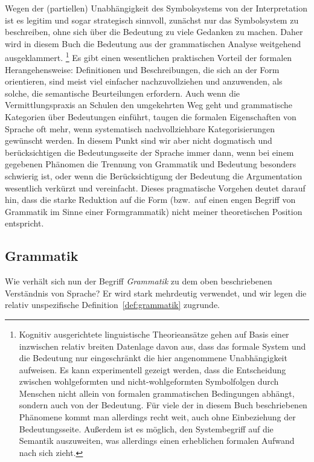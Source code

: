 Wegen der (partiellen) Unabhängigkeit des Symbolsystems von der Interpretation ist es legitim und sogar strategisch sinnvoll, zunächst nur das Symbolsystem zu beschreiben, ohne sich über die Bedeutung zu viele Gedanken zu machen.
Daher wird in diesem Buch die Bedeutung aus der grammatischen Analyse weitgehend ausgeklammert.%
\footnote{Kognitiv ausgerichtete linguistische Theorieansätze gehen auf Basis einer inzwischen relativ breiten Datenlage davon aus, dass das formale System und die Bedeutung nur eingeschränkt die hier angenommene Unabhängigkeit aufweisen.
Es kann \zB experimentell gezeigt werden, dass die Entscheidung zwischen wohlgeformten und nicht-wohlgeformten Symbolfolgen durch Menschen nicht allein von formalen grammatischen Bedingungen abhängt, sondern auch von der Bedeutung.
Für viele der in diesem Buch beschriebenen Phänomene kommt man allerdings recht weit, auch ohne Einbeziehung der Bedeutungsseite.
Außerdem ist es möglich, den Systembegriff auf die Semantik auszuweiten, was allerdings einen erheblichen formalen Aufwand nach sich zieht.}
Es gibt einen wesentlichen praktischen Vorteil der formalen Herangehensweise:
Definitionen und Beschreibungen, die sich an der Form orientieren, sind meist viel einfacher nachzuvollziehen und anzuwenden, als solche, die semantische Beurteilungen erfordern.
Auch wenn die Vermittlungspraxis an Schulen \idR den umgekehrten Weg geht und grammatische Kategorien über Bedeutungen einführt, taugen die formalen Eigenschaften von Sprache oft mehr, wenn systematisch nachvollziehbare Kategorisierungen gewünscht werden.
In diesem Punkt sind wir aber nicht dogmatisch und berücksichtigen die Bedeutungsseite der Sprache immer dann, wenn bei einem gegebenen Phänomen die Trennung von Grammatik und Bedeutung besonders schwierig ist, oder wenn die Berücksichtigung der Bedeutung die Argumentation wesentlich verkürzt und vereinfacht.
Dieses pragmatische Vorgehen deutet darauf hin, dass die starke Reduktion auf die Form (bzw.\ auf einen engen Begriff von Grammatik im Sinne einer Formgrammatik) nicht meiner theoretischen Position entspricht.

\subsection{Grammatik}

\label{sec:grammatikbegriff}

Wie verhält sich nun der Begriff \textit{Grammatik} zu dem oben beschriebenen Verständnis von Sprache?
Er wird stark mehrdeutig verwendet, und wir legen die relativ unspezifische Definition~\ref{def:grammatik} zugrunde.

